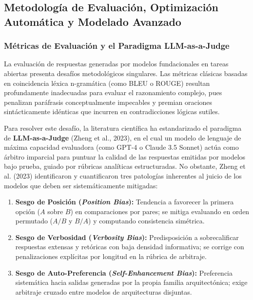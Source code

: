 \newpage
\subsection{Metodología de Evaluación, Optimización Automática y Modelado Avanzado}

\subsubsection{Métricas de Evaluación y el Paradigma LLM-as-a-Judge}

La evaluación de respuestas generadas por modelos fundacionales en tareas abiertas presenta desafíos metodológicos singulares. Las métricas clásicas basadas en coincidencia léxica n-gramática (como BLEU o ROUGE) resultan profundamente inadecuadas para evaluar el razonamiento complejo, pues penalizan paráfrasis conceptualmente impecables y premian oraciones sintácticamente idénticas que incurren en contradicciones lógicas sutiles.

Para resolver este desafío, la literatura científica ha estandarizado el paradigma de \textbf{LLM-as-a-Judge} (Zheng et al., 2023), en el cual un modelo de lenguaje de máxima capacidad evaluadora (como GPT-4 o Claude 3.5 Sonnet) actúa como árbitro imparcial para puntuar la calidad de las respuestas emitidas por modelos bajo prueba, guiado por rúbricas analíticas estructuradas. No obstante, Zheng et al. (2023) identificaron y cuantificaron tres patologías inherentes al juicio de los modelos que deben ser sistemáticamente mitigadas:

\begin{enumerate}[topsep=0.12cm, itemsep=0.12cm, parsep=0pt, leftmargin=1.5em]
    \item \textbf{Sesgo de Posición (\textit{Position Bias}):} Tendencia a favorecer la primera opción ($A$ sobre $B$) en comparaciones por pares; se mitiga evaluando en orden permutado ($A/B$ y $B/A$) y computando consistencia simétrica.
    \item \textbf{Sesgo de Verbosidad (\textit{Verbosity Bias}):} Predisposición a sobrecalificar respuestas extensas y retóricas con baja densidad informativa; se corrige con penalizaciones explícitas por longitud en la rúbrica de arbitraje.
    \item \textbf{Sesgo de Auto-Preferencia (\textit{Self-Enhancement Bias}):} Preferencia sistemática hacia salidas generadas por la propia familia arquitectónica; exige arbitraje cruzado entre modelos de arquitecturas disjuntas.
\end{enumerate}

